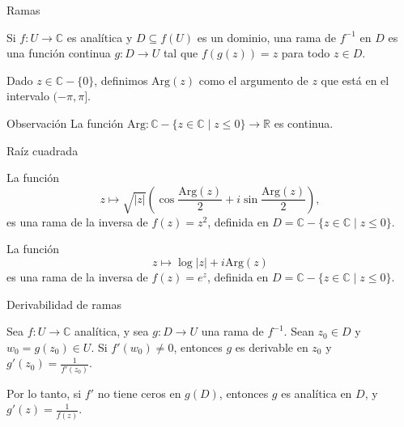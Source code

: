 \documentclass[spanish,presentation]{beamer}
\begin{document}
\begin{frame}[label=sec-3-3]{Ramas}
\begin{definition}
Si \(f\colon U\to \mathbb{C}\) es analítica y \(D\subseteq f(U)\)
es un dominio, una \alert{rama de \(f^{-1}\) en \(D\)} es una función
continua \(g\colon D\to U\) tal que \(f(g(z))=z\) para todo \(z\in
    D\).
\end{definition}

\begin{definition}
Dado \(z\in \mathbb{C}-\{0\}\), definimos
\(\mathrm{Arg}(z)\) como el argumento de \(z\) que está en el
intervalo \((-\pi,\pi]\).
\end{definition}

\begin{block}{Observación}
La función \(\mathrm{Arg}\colon \mathbb{C}-\{z\in \mathbb{C}\mid
    z\leq 0\}\to \mathbb{R}\) es continua.
\end{block}
\end{frame}

\begin{frame}[label=sec-3-4]{Raíz cuadrada}
\begin{example}
La función
\begin{displaymath}
z\mapsto \sqrt{|z|}(\cos \frac{\mathrm{Arg}(z)}{2}+i\sin\frac{\mathrm{Arg}(z)}{2}),
\end{displaymath}
es una rama de la inversa de \(f(z)=z^{2}\), definida en
\(D=\mathbb{C}-\{z\in \mathbb{C}\mid z\leq 0\}\).
\end{example}

\begin{example}
La función 
\begin{displaymath}
z\mapsto \log |z|+i\mathrm{Arg}(z)
\end{displaymath}
es una rama de la inversa de \(f(z)=e^{z}\), definida en
\(D=\mathbb{C}-\{z\in \mathbb{C}\mid z\leq 0\}\).
\end{example}
\end{frame}

\begin{frame}[label=sec-3-5]{Derivabilidad de ramas}
\begin{theorem}
Sea \(f\colon U\to \mathbb{C}\) analítica, y sea \(g\colon D\to
    U\) una rama de \(f^{-1}\). Sean \(z_{0}\in D\) y
\(w_{0}=g(z_{0})\in U\). Si \(f'(w_{0})\ne 0\), entonces \(g\) es
derivable en \(z_{0}\) y \(g'(z_{0})=\frac{1}{f'(z_{0})}\).

Por lo tanto, si \(f'\) no tiene ceros en \(g(D)\), entonces \(g\)
es analítica en \(D\), y \(g'(z)=\frac{1}{f(z)}\).
\end{theorem}
\end{frame}
\end{document}
